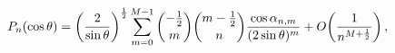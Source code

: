 \[\mathop{P_{n}\/}\nolimits\!\left(\mathop{\cos\/}\nolimits\theta\right)=\left(%
\frac{2}{\mathop{\sin\/}\nolimits\theta}\right)^{\frac{1}{2}}\sum_{m=0}^{M-1}%
\binom{-\tfrac{1}{2}}{m}\binom{m-\frac{1}{2}}{n}\frac{\mathop{\cos\/}\nolimits%
\alpha_{n,m}}{(2\mathop{\sin\/}\nolimits\theta)^{m}}+\mathop{O\/}\nolimits\!%
\left(\frac{1}{n^{M+\frac{1}{2}}}\right),\]
